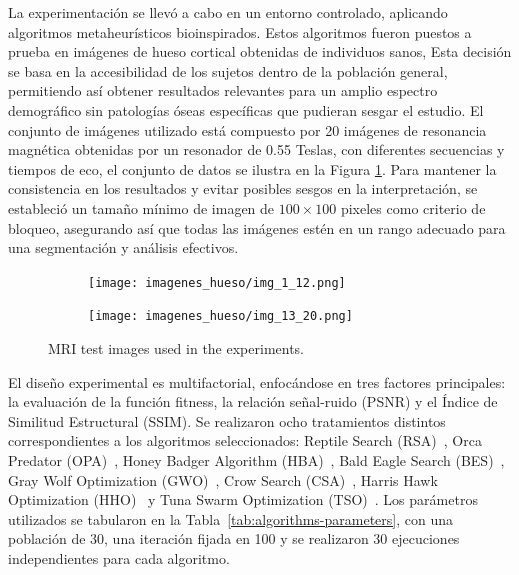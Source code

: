 \documentclass[conference]{IEEEtran}
\begin{document}
\noindent La experimentación se llevó a cabo en un entorno controlado, aplicando algoritmos metaheurísticos bioinspirados. Estos algoritmos fueron puestos a prueba en imágenes de hueso cortical obtenidas de individuos sanos, Esta decisión se basa en la accesibilidad de los sujetos dentro de la población general, permitiendo así obtener resultados relevantes para un amplio espectro demográfico sin patologías óseas específicas que pudieran sesgar el estudio. El conjunto de imágenes utilizado está compuesto por 20 imágenes de resonancia magnética obtenidas por un resonador de 0.55 Teslas, con diferentes secuencias y tiempos de eco, el conjunto de datos se ilustra en la Figura \ref{fig:imagenes}.
Para mantener la consistencia en los resultados y evitar posibles sesgos en la interpretación, se estableció un tamaño mínimo de imagen de $100\times100$ pixeles como criterio de bloqueo, asegurando así que todas las imágenes estén en un rango adecuado para una segmentación y análisis efectivos.

\begin{figure}
    \centering

    \begin{subfigure}{0.5\textwidth}
        \texttt{[image: imagenes\_hueso/img\_1\_12.png]}
    \end{subfigure}
    
    \begin{subfigure}{0.5\textwidth}
        \texttt{[image: imagenes\_hueso/img\_13\_20.png]}
    \end{subfigure}
    \caption{MRI test images used in the experiments.}
\label{fig:imagenes}    
\end{figure}


\noindent El diseño experimental es multifactorial, enfocándose en tres factores principales: la evaluación de la función fitness, la relación señal-ruido (PSNR) y el Índice de Similitud Estructural (SSIM). Se realizaron ocho tratamientos distintos correspondientes a los algoritmos seleccionados: Reptile Search (RSA)~\cite{Abualigah2022}, Orca Predator (OPA)~\cite{Jiang2022}, Honey Badger Algorithm (HBA)~\cite{Hashim2022}, Bald Eagle Search (BES)~\cite{Alsattar2019}, Gray Wolf Optimization (GWO)~\cite{Mirjalili2014}, Crow Search (CSA)~\cite{Askarzadeh2016}, Harris Hawk Optimization (HHO)~\cite{Heidari2019}  y Tuna Swarm Optimization (TSO)~\cite{Xie2021}. Los parámetros utilizados se tabularon en la Tabla~\ref{tab:algorithms-parameters}, con una población de 30, una iteración fijada en 100 y se realizaron 30 ejecuciones independientes para cada algoritmo.
\end{document}
